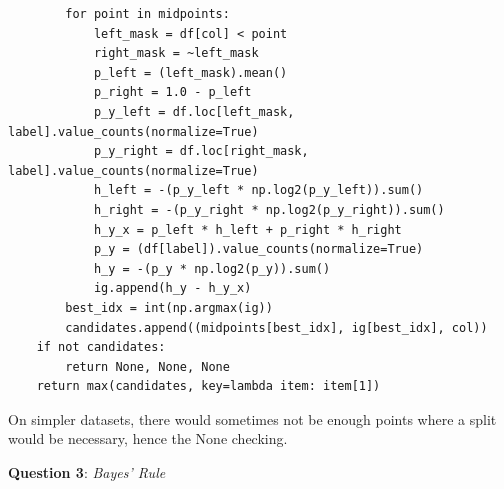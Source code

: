 \documentclass{article} %
\newcommand{\question}[2][]{
  \begin{flushleft}
    \textbf{Question #1}: \textit{#2}

\end{flushleft}}
\begin{document}
\begin{enumerate}[(a)]
\begin{verbatim}
        for point in midpoints:
            left_mask = df[col] < point
            right_mask = ~left_mask
            p_left = (left_mask).mean()
            p_right = 1.0 - p_left
            p_y_left = df.loc[left_mask, label].value_counts(normalize=True)
            p_y_right = df.loc[right_mask, label].value_counts(normalize=True)
            h_left = -(p_y_left * np.log2(p_y_left)).sum()
            h_right = -(p_y_right * np.log2(p_y_right)).sum()
            h_y_x = p_left * h_left + p_right * h_right
            p_y = (df[label]).value_counts(normalize=True)
            h_y = -(p_y * np.log2(p_y)).sum()
            ig.append(h_y - h_y_x)
        best_idx = int(np.argmax(ig))
        candidates.append((midpoints[best_idx], ig[best_idx], col))
    if not candidates:
        return None, None, None
    return max(candidates, key=lambda item: item[1])
    \end{verbatim}
    On simpler datasets, there would sometimes not be enough points
    where a split would be necessary, hence the None checking.
\end{enumerate}
\question[3]{Bayes' Rule}
\end{document}
